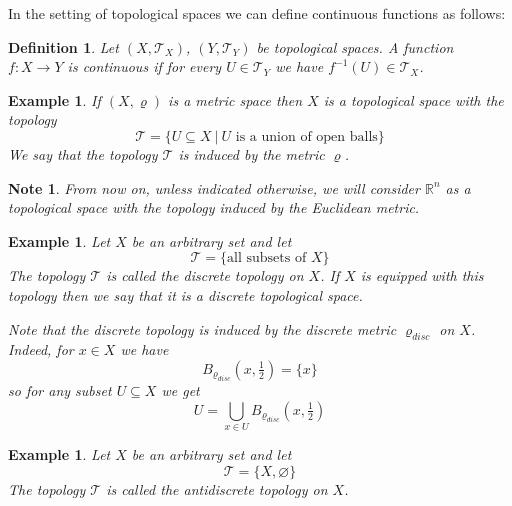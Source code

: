 \documentclass[11pt, letterpaper, oneside]{report}
\theoremstyle{pplain}
\newtheorem{ITERMVALUE THM}[theorem]{Intermediate Value Theorem}
\newtheorem{HEINEBOREL THM}[theorem]{Heine-Borel Theorem}
\newtheorem{UMETR THM}[theorem]{Urysohn Metrization Theorem}
\newtheorem{UMETR2 THM}[theorem]{Urysohn Metrization Theorem (v.2)}
\theoremstyle{ddefinition}
\newtheorem{definition}[theorem]{Definition}
\newtheorem{example}[theorem]{Example}
\newtheorem{note}[theorem]{Note}
\theoremstyle{nnn}
\newtheorem{TDA NN}[theorem]{Topological Data Analysis. }
\theoremstyle{eexercise}
\newcommand{\R}{{\mathbb R}}
\newcommand{\TT}{{\mathcal T}}
\begin{document}
In the setting of topological spaces we can define continuous functions as follows:

\begin{definition}
Let $(X, \TT_{X})$, $(Y, \TT_{Y})$ be topological spaces. A function $f\colon X\to Y$ is 
\emph{continuous} if for every $U\in \TT_{Y}$ we have $f^{-1}(U)\in \TT_{X}$. 
\end{definition}

\begin{example}
\label{METRIC TOP EXAMPLE}
If $(X, \varrho)$ is a metric space then $X$ is a topological space with the topology 
$$\TT= \{U\subseteq X \ | \ U \text{ is a union of open balls}\}$$
We say that the topology $\TT$ is \emph{induced by the metric $\varrho$}.
\end{example}

\begin{note}
From now on, unless indicated otherwise, we will consider $\R^{n}$ as a topological space with 
the topology induced by the Euclidean metric. 
\end{note}

\begin{example}
Let $X$ be an arbitrary set and let 
$$\TT= \{ \text{all subsets of $X$}\}$$
The topology $\TT$ is called the \emph{discrete topology} on $X$. If $X$ is equipped with this topology 
then we say that it is a \emph{discrete topological space}. 


Note that the discrete topology is induced by the discrete metric $\varrho_{disc}$ on $X$. 
Indeed, for $x\in X$ we have 
$$B_{\varrho_{disc}}\left(x, \tfrac{1}{2}\right) = \{x\}$$
so for any subset $U\subseteq X$ we get 
$$U = \bigcup_{x\in U}B_{\varrho_{disc}}\left(x, \tfrac{1}{2}\right) $$
\end{example}


\begin{example}
\label{ANTIDISCRT TOP EXAMPLE}
Let $X$ be an arbitrary set and let 
$$\TT = \{X, \varnothing\}$$
The topology $\TT$ is called the \emph{antidiscrete topology} on $X$. 
\end{example}
\end{document}
